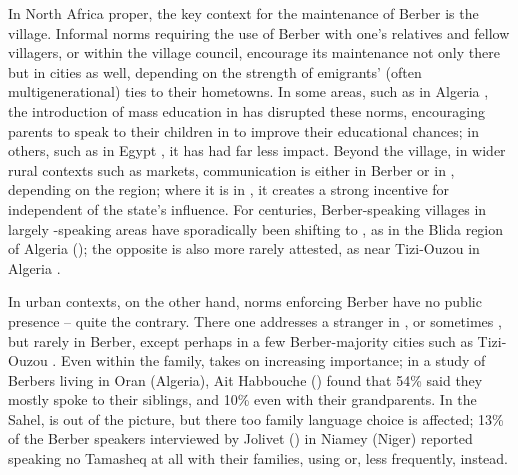 \documentclass[output=paper]{langsci/langscibook}
\begin{document}
In North Africa proper, the key context for the maintenance of Berber is the village. Informal norms requiring the use of Berber with one's relatives and fellow villagers, or within the village council, encourage its maintenance not only there but in cities as well, depending on the strength of emigrants' (often multigenerational) ties to their hometowns. In some areas, such as  in Algeria \citep{Mouili2013}, the introduction of mass education in  has disrupted these norms, encouraging parents to speak to their children in  to improve their educational chances; in others, such as  in Egypt \citep{Serreli2017}, it has had far less impact. Beyond the village, in wider rural contexts such as markets, communication is either in Berber or in , depending on the region; where it is in , it creates a strong incentive for  independent of the state's influence.  For centuries, Berber-speaking villages in largely -speaking areas have sporadically been shifting to , as in the Blida region of Algeria (\citealt{ElArifi2014}); the opposite is also more rarely attested, as near Tizi-Ouzou in Algeria \citep[258]{Gautier1913}.

In urban contexts, on the other hand, norms enforcing Berber have no public presence – quite the contrary.  There one addresses a stranger in , or sometimes , but rarely in Berber, except perhaps in a few Berber-majority cities such as Tizi{}-Ouzou \citep{Tigziri2008}.  Even within the family,  takes on increasing importance; in a study of  Berbers living in Oran (Algeria), Ait Habbouche (\citeyear[79]{AitHabbouche2013}) found that 54\% said they mostly spoke  to their siblings, and 10\% even with their grandparents. In the Sahel,  is out of the picture, but there too family language choice is affected; 13\% of the Berber speakers interviewed by Jolivet (\citeyear[146]{Jolivet2008}) in Niamey (Niger) reported speaking no Tamasheq at all with their families, using  or, less frequently,  instead.
\end{document}
